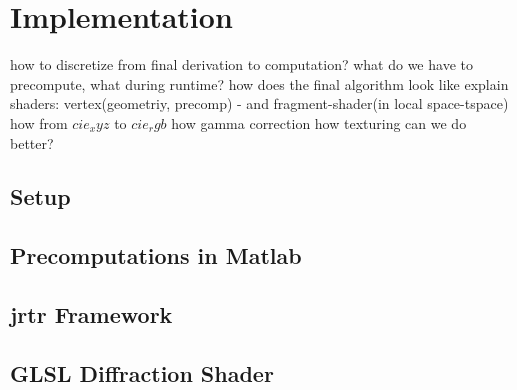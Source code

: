 \section{Implementation}

how to discretize from final derivation to computation?
what do we have to precompute, what during runtime?
how does the final algorithm look like
explain shaders: vertex(geometriy, precomp) - and fragment-shader(in local space-tspace)
how from $cie_xyz$ to $cie_rgb$
how gamma correction
how texturing 
can we do better?

\subsection{Setup}
\subsection{Precomputations in Matlab}
\subsection{jrtr Framework}
\subsection{GLSL Diffraction Shader}
